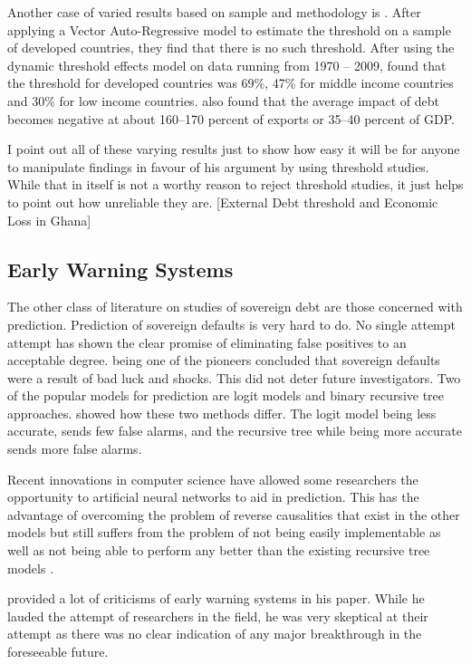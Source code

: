 \documentclass[12pt, a4paper]{article}
\begin{document}
	Another case of varied results based on sample and methodology is . After applying a Vector Auto-Regressive model to estimate the threshold on a sample of developed countries, they find that there is no such threshold.
	After using the dynamic threshold effects model on data running from 1970 -- 2009,  found that the threshold for developed countries was 69\%, 47\% for middle income countries and 30\% for low income countries.  also found that the average impact of debt becomes negative at about 160–170 percent of exports or 35–40 percent of GDP.
	
	I point out all of these varying results just to show how easy it will be for anyone to manipulate findings in favour of his argument by using threshold studies. While that in itself is not a worthy reason to reject threshold studies, it just helps to point out how unreliable they are.
	[External Debt threshold and Economic Loss in Ghana] %
	
	\subsection{Early Warning Systems}
	The other class of literature on studies of sovereign debt are those concerned with prediction. Prediction of sovereign defaults is very hard to do. No single attempt attempt has shown the clear promise of eliminating false positives to an acceptable degree.  being one of the pioneers concluded that sovereign defaults were a result of bad luck and shocks. This did not deter future investigators. Two of the popular models for prediction are logit models and binary recursive tree approaches.  showed how these two methods differ. The logit model being less accurate, sends few false alarms, and the recursive tree while being more accurate sends more false alarms.
	
	Recent innovations in computer science have allowed some researchers the opportunity to artificial neural networks to aid in prediction. This has the advantage of overcoming the problem of reverse causalities that exist in the other models but still suffers from the problem of not being easily implementable as well as not being able to perform any better than the existing recursive tree models \cite{Marc-2008}. 
	
	 provided a lot of criticisms of early warning systems in his paper. While he lauded the attempt of researchers in the field, he was very skeptical at their attempt as there was no clear indication of any major breakthrough in the foreseeable future.
	
\end{document}
